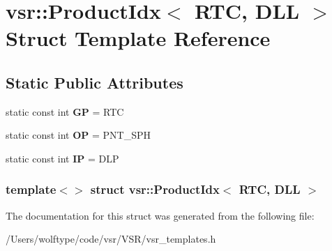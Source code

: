 \hypertarget{structvsr_1_1_product_idx_3_01_r_t_c_00_01_d_l_l_01_4}{\section{vsr\-:\-:Product\-Idx$<$ R\-T\-C, D\-L\-L $>$ Struct Template Reference}
\label{structvsr_1_1_product_idx_3_01_r_t_c_00_01_d_l_l_01_4}
}
\subsection*{Static Public Attributes}
\begin{DoxyCompactItemize}
\item 
\hypertarget{structvsr_1_1_product_idx_3_01_r_t_c_00_01_d_l_l_01_4_af2a9bb7d0996a6f35e92237adca7a987}{static const int {\bfseries G\-P} = R\-T\-C}\label{structvsr_1_1_product_idx_3_01_r_t_c_00_01_d_l_l_01_4_af2a9bb7d0996a6f35e92237adca7a987}

\item 
\hypertarget{structvsr_1_1_product_idx_3_01_r_t_c_00_01_d_l_l_01_4_a49fcf979974c9e5a18e52595f3539ade}{static const int {\bfseries O\-P} = P\-N\-T\-\_\-\-S\-P\-H}\label{structvsr_1_1_product_idx_3_01_r_t_c_00_01_d_l_l_01_4_a49fcf979974c9e5a18e52595f3539ade}

\item 
\hypertarget{structvsr_1_1_product_idx_3_01_r_t_c_00_01_d_l_l_01_4_ac824e4e1e62bf9549571e07cd294511c}{static const int {\bfseries I\-P} = D\-L\-P}\label{structvsr_1_1_product_idx_3_01_r_t_c_00_01_d_l_l_01_4_ac824e4e1e62bf9549571e07cd294511c}

\end{DoxyCompactItemize}
\subsubsection*{template$<$$>$ struct vsr\-::\-Product\-Idx$<$ R\-T\-C, D\-L\-L $>$}



The documentation for this struct was generated from the following file\-:\begin{DoxyCompactItemize}
\item 
/\-Users/wolftype/code/vsr/\-V\-S\-R/vsr\-\_\-templates.\-h\end{DoxyCompactItemize}

